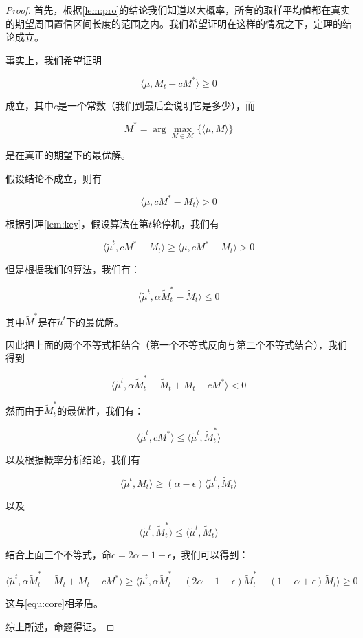 \documentclass[bachelor]{thuthesis}
\begin{document}
\begin{proof}

首先，根据\ref{lem:pro}的结论我们知道以大概率，所有的取样平均值都在真实的期望周围置信区间长度的范围之内。我们希望证明在这样的情况之下，定理的结论成立。

事实上，我们希望证明

\[\langle \mu,M_t-c M^*\rangle\ge 0\]

成立，其中$c$是一个常数（我们到最后会说明它是多少），而

\[M^*=\arg\max_{M\in\mathcal{M}}\{\langle\mu,M \rangle\}\]

是在真正的期望下的最优解。

假设结论不成立，则有

\[\langle \mu,c M^*-M_t\rangle > 0\]

根据引理\ref{lem:key}，假设算法在第$t$轮停机，我们有

\[\langle \tilde{\mu}^t,c M^*-M_t\rangle \ge\langle \mu,c M^*-M_t\rangle > 0\]

但是根据我们的算法，我们有：

\[\langle \tilde{\mu}^t,\alpha\tilde{M}^*_t- \tilde{M}_t\rangle\le 0\]

其中$\tilde{M}^*$是在$\tilde{\mu}^t$下的最优解。

因此把上面的两个不等式相结合（第一个不等式反向与第二个不等式结合），我们得到

\begin{equation}
\label{equ:core}
\langle \tilde{\mu}^t,\alpha\tilde{M}^*_t- \tilde{M}_t+M_t-cM^*\rangle < 0
\end{equation}

然而由于$\tilde{M}^*_t$的最优性，我们有：

\[\langle \tilde{\mu}^t,c M^*\rangle \le \langle \tilde{\mu}^t,\tilde{M}^*_t\rangle\]

以及根据概率分析结论，我们有

\[\langle \tilde{\mu}^t, M_t\rangle\ge (\alpha-\epsilon)\langle \tilde{\mu}^t, \tilde{M}_t\rangle\]

以及

\[\langle \tilde{\mu}^t,\tilde{M}^*_t\rangle \le \langle \tilde{\mu}^t,\tilde{M}_t\rangle\]

结合上面三个不等式，命$c=2\alpha-1-\epsilon$，我们可以得到：

\[
\langle \tilde{\mu}^t,\alpha\tilde{M}^*_t- \tilde{M}_t+M_t-cM^*\rangle \ge \langle \tilde{\mu}^t,\alpha\tilde{M}^*_t- (2\alpha-1-\epsilon)\tilde{M}^*_t-(1-\alpha+\epsilon)\tilde{M}_t\rangle\ge 0
\]

这与\ref{equ:core}相矛盾。

综上所述，命题得证。

\end{proof}
\end{document}
